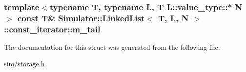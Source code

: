 \hypertarget{struct_simulator_1_1_linked_list_1_1const__iterator_a20b5a3e97a0bb527e810203b90b0f757}{
\subsubsection[{m\+\_\+tail}]{\setlength{\rightskip}{0pt plus 5cm}template$<$typename T, typename L, T L\+::value\+\_\+type\+::$\ast$ N$>$ const T\& {\bf Simulator\+::\+Linked\+List}$<$ T, L, N $>$\+::const\+\_\+iterator\+::m\+\_\+tail}}\label{struct_simulator_1_1_linked_list_1_1const__iterator_a20b5a3e97a0bb527e810203b90b0f757}


The documentation for this struct was generated from the following file\+:\begin{DoxyCompactItemize}
\item 
sim/\hyperlink{storage_8h}{storage.\+h}\end{DoxyCompactItemize}
